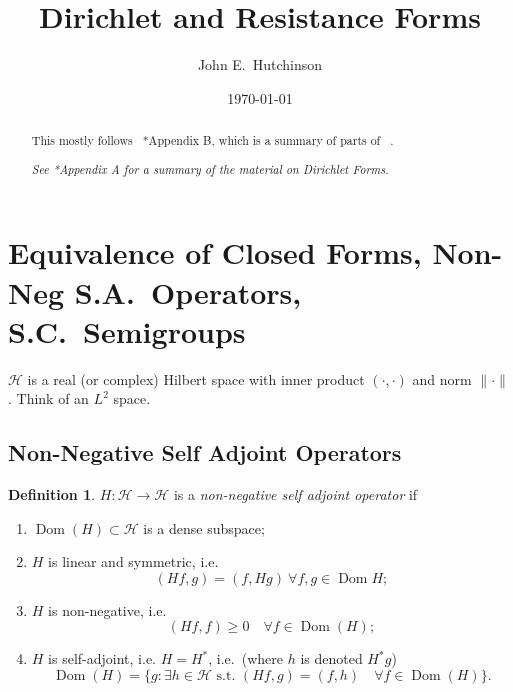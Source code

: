 \documentclass[a4paper]{amsart}
\theoremstyle{plain}
\theoremstyle{definition}
\newtheorem{definition}[theorem]{Definition}%
\theoremstyle{remark}
\DeclareMathOperator{\dom}{Dom}
\begin{document}
\title{Dirichlet and Resistance Forms}  
\author{John E.\ Hutchinson}
\date{\today}

\begin{abstract} 
This mostly follows ~\cite{Kig}*{Appendix B}, which is a summary of parts of ~\cite{FOT}.

\emph{See \cite{Eva}*{Appendix A} for a summary of the material on Dirichlet Forms.}

\end{abstract}

\maketitle

\tableofcontents


\section{\textbf{Equivalence of Closed Forms, Non-Neg S.A.\ Operators, S.C.\ Semigroups}}

$ \mathcal{H} $ is a real (or complex) Hilbert space with inner product $ (\cdot,\cdot) $ and norm $ \|\cdot \| $.  Think of an $ L^2 $ space.

\subsection{Non-Negative Self Adjoint Operators}
\begin{definition}\label{dsa}
$ H : \mathcal{H} \to \mathcal{H} $ is a \emph{non-negative self adjoint operator} if 
\begin{enumerate}
\item $\dom (H) \subset \mathcal{H} $ is a dense subspace;
\item $ H $ is linear and symmetric, i.e.
\[  (Hf,g) = (f,Hg) \ \forall f,g \in \dom H ;\]
\item $ H $ is non-negative, i.e.
\[ (Hf,f) \geq 0 \quad \forall f \in \dom (H);\]
\item $ H $ is self-adjoint, i.e. $ H=H^*$, i.e.\ (where $ h $ is denoted $ H^* g $)
\[ \dom(H) = \Big\{ g : \exists h\in \mathcal{H}  \text{ s.t.\ }  (Hf,g) = (f,h) \quad  \forall f \in \dom (H) \Big\}.
\]
\end{enumerate} 
\end{definition} 
\end{document}
